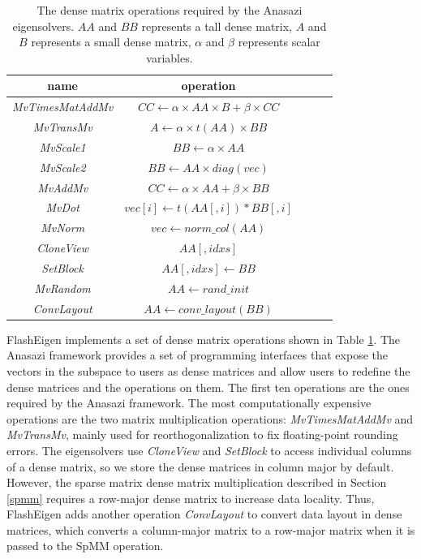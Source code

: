\begin{table}
	\begin{center}
		\small
		\begin{tabular}{|c|c|c|c|c|}
			\hline
			name & operation \\
			\hline
			\textit{MvTimesMatAddMv} & $CC \leftarrow \alpha \times AA \times B + \beta \times CC$ \\
			\hline
			\textit{MvTransMv} & $A \leftarrow \alpha \times t(AA) \times BB$ \\
			\hline
			\textit{MvScale1} & $BB \leftarrow \alpha \times AA$ \\
			\hline
			\textit{MvScale2} & $BB \leftarrow AA \times diag(vec)$ \\
			\hline
			\textit{MvAddMv} & $CC \leftarrow \alpha \times AA + \beta \times BB$ \\
			\hline
			\textit{MvDot} & $vec[i] \leftarrow t(AA[,i]) * BB[,i]$ \\
			\hline
			\textit{MvNorm} & $vec \leftarrow norm\_col(AA)$ \\
			\hline
			\textit{CloneView} & $AA[,idxs]$ \\
			\hline
			\textit{SetBlock} & $AA[,idxs] \leftarrow BB$ \\
			\hline
			\textit{MvRandom} & $AA \leftarrow rand\_init$ \\
			\hline
			\textit{ConvLayout} & $AA \leftarrow conv\_layout(BB)$ \\
			\hline
		\end{tabular}
		\normalsize
	\end{center}
	\caption{The dense matrix operations required by the Anasazi eigensolvers.
		$AA$ and $BB$ represents a tall dense matrix, $A$ and $B$ represents
		a small dense matrix, $\alpha$ and $\beta$ represents scalar variables.}
	\label{anasazi_ops}
\end{table}

FlashEigen implements a set of dense matrix operations shown in Table
\ref{anasazi_ops}. The Anasazi framework provides a set of programming
interfaces that expose the vectors in the subspace to users as dense matrices
and allow users to redefine the dense matrices and the operations on them.
The first ten operations are the ones required by the Anasazi
framework. The most computationally expensive operations are the two
matrix multiplication operations: \textit{MvTimesMatAddMv} and \textit{MvTransMv},
mainly used for reorthogonalization to fix floating-point rounding errors.
The eigensolvers use \textit{CloneView} and \textit{SetBlock} to access individual
columns of a dense matrix, so we store the dense matrices in column major by default.
However, the sparse matrix dense matrix multiplication described in Section
\ref{spmm} requires a row-major dense matrix to increase data locality. Thus,
FlashEigen adds another operation \textit{ConvLayout} to convert data layout
in dense matrices, which converts a column-major matrix to a row-major
matrix when it is passed to the SpMM operation.

